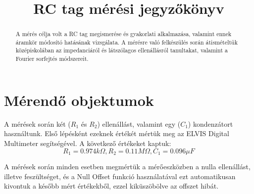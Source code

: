 \documentclass[10pt, conference,a4paper]{ITKproc}
\begin{document}
\title{RC tag mérési jegyzőkönyv}
\author{
}


\maketitle

\begin{abstract}
A mérés célja volt a RC tag megismerése és gyakorlati alkalmazása, valamint ennek áramkör módosító hatásának vizsgálata. A mérésre való felkészülés során átismételtük középiskolában az impedanciáról és látszólagos ellenállásról tanultakat, valamint a Fourier sorfejtés módszereit. \end{abstract}

\IEEEpeerreviewmaketitle
\section{Mérendő objektumok}
A mérések során két ($R_1$ és $R_2$) ellenállást, valamint egy ($C_1$) kondenzátort használtunk. Első lépésként ezeknek értékét mértük meg az ELVIS Digital Multimeter segítségével. A következő értékeket kaptuk: \[R_1 = 0.974 k\Omega, R_2 = 0.11 M\Omega, C_1 = 0.096 \mu F\]


A mérések során minden esetben megmértük a mérőeszközben a nulla ellenállást, illetve feszültséget, és a Null Offset funkció használatával ezt automatikusan kivontuk a később mért értékekből, ezzel kiküszöbölve az offszet hibát. 
\end{document}
